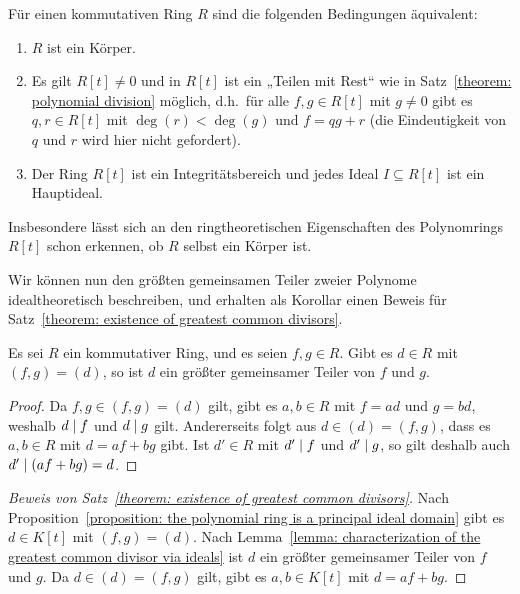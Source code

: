 \begin{remark}
  Für einen kommutativen Ring $R$ sind die folgenden Bedingungen äquivalent:
  \begin{enumerate}
    \item
      $R$ ist ein Körper.
    \item
      Es gilt $R[t] \neq 0$ und in $R[t]$ ist ein „Teilen mit Rest“ wie in Satz~\ref{theorem: polynomial division} möglich, d.h.\ für alle $f, g \in R[t]$ mit $g \neq 0$ gibt es $q, r \in R[t]$ mit $\deg(r) < \deg(g)$ und $f = q g + r$ (die Eindeutigkeit von $q$ und $r$ wird hier nicht gefordert).
    \item
      Der Ring $R[t]$ ist ein Integritätsbereich und jedes Ideal $I \subseteq R[t]$ ist ein Hauptideal.
  \end{enumerate}
  Insbesondere lässt sich an den ringtheoretischen Eigenschaften des Polynomrings $R[t]$ schon erkennen, ob $R$ selbst ein Körper ist.
\end{remark}

Wir können nun den größten gemeinsamen Teiler zweier Polynome idealtheoretisch beschreiben, und erhalten als Korollar einen Beweis für Satz~\ref{theorem: existence of greatest common divisors}.

\begin{lemma}
  \label{lemma: characterization of the greatest common divisor via ideals}
  Es sei $R$ ein kommutativer Ring, und es seien $f, g \in R$.
  Gibt es $d \in R$ mit $(f, g ) = (d)$, so ist $d$ ein größter gemeinsamer Teiler von $f$ und $g$.
\end{lemma}

\begin{proof}
  Da $f, g \in (f,g) = (d)$ gilt, gibt es $a, b \in R$ mit $f = ad$ und $g = bd$, weshalb $d \mathrel{|} f$ und $d \mathrel{|} g$ gilt.
  Andererseits folgt aus $d \in (d) = (f,g)$, dass es $a, b \in R$ mit $d = af + bg$ gibt.
  Ist $d' \in R$ mit $d' \mathrel{|} f$ und $d' \mathrel{|} g$, so gilt deshalb auch $d' \mathrel{|} (af + bg) = d$.
\end{proof}

\begin{proof}[Beweis von Satz~\ref{theorem: existence of greatest common divisors}]
  Nach Proposition~\ref{proposition: the polynomial ring is a principal ideal domain} gibt es $d \in K[t]$ mit $(f,g) = (d)$.
  Nach Lemma~\ref{lemma: characterization of the greatest common divisor via ideals} ist $d$ ein größter gemeinsamer Teiler von $f$ und $g$.
  Da $d \in (d) = (f,g)$ gilt, gibt es $a, b \in K[t]$ mit $d = af + bg$.
\end{proof}

